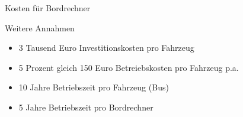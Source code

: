 
\begin{frame}{Kosten für Bordrechner}
  \begin{block}{Weitere Annahmen}
  \begin{itemize}
  \item 3 Tausend Euro Investitionskosten pro Fahrzeug
  \item 5 Prozent gleich 150 Euro Betreiebskosten pro Fahrzeug p.a.
  \item 10 Jahre Betriebszeit pro Fahrzeug (Bus)
  \item 5 Jahre Betriebszeit pro Bordrechner
  \end{itemize}
  \end{block}
\end{frame}

